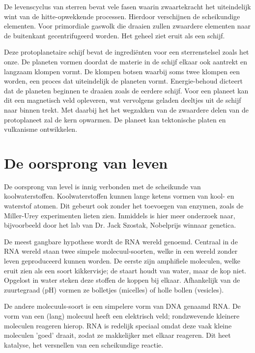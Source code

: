 \documentclass{article}
\begin{document}
        De levenscyclus van sterren bevat vele fasen waarin zwaartekracht het uiteindelijk wint van de hitte-opwekkende processen. Hierdoor verschijnen de scheikundige elementen. Voor primordiale gaswolk die draaien zullen zwaardere elementen naar de buitenkant gecentrifugeerd worden. Het geheel ziet eruit als een schijf.   
        
        Deze protoplanetaire schijf bevat de ingredi\"enten voor een sterrenstelsel zoals het onze. De planeten vormen doordat de materie in de schijf elkaar ook aantrekt en langzaam klompen vormt. De klompen botsen waarbij soms twee klompen een worden, een proces dat uiteindelijk de planeten vormt. Energie-behoud dicteert dat de planeten beginnen te draaien zoals de eerdere schijf. Voor een planeet kan dit een magnetisch veld opleveren, wat vervolgens geladen deeltjes uit de schijf naar binnen trekt. Met daarbij het het wegzakken van de zwaardere delen van de protoplaneet zal de kern opwarmen. De planeet kan tektonische platen en vulkanisme ontwikkelen.
    
    \section{De oorsprong van leven}
        De oorsprong van level is innig verbonden met de scheikunde van koolwaterstoffen. Koolwaterstoffen kunnen lange ketens vormen van kool- en waterstof atomen. Dit gebeurt ook zonder het toevoegen van enzymen, zoals de Miller-Urey experimenten lieten zien. Inmiddels is hier meer onderzoek naar, bijvoorbeeld door het lab van Dr. Jack Szostak, Nobelprijs winnaar genetica. 
        
        De meest gangbare hypothese wordt de RNA wereld genoemd. Centraal in de RNA wereld staan twee simpele molecuul-soorten, welke in een wereld zonder leven geproduceerd kunnen worden. De eerste zijn amphifiele moleculen, welke eruit zien als een soort kikkervisje; de staart houdt van water, maar de kop niet. Opgelost in water steken deze stoffen de koppen bij elkaar. Afhankelijk van de zuurtegraad (pH) vormen ze bolletjes (micelles) of holle bollen (vesicles).
        
        De andere molecuuls-soort is een simpelere vorm van DNA genaamd RNA. De vorm van een (lang) molecuul heeft een elektrisch veld; rondzwevende kleinere moleculen reageren hierop. RNA is redelijk speciaal omdat deze vaak kleine moleculen 'goed' draait, zodat ze makkelijker met elkaar reageren. Dit heet katalyse, het versnellen van een scheikundige reactie.
        
\end{document}
